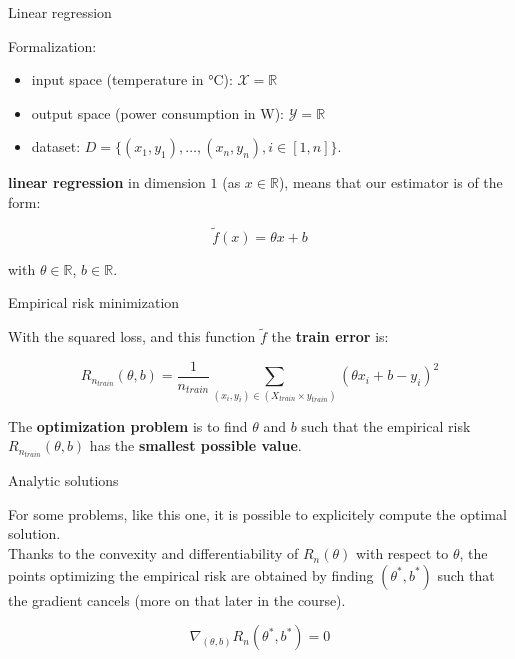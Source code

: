 \documentclass[usenames,dvipsnames,french]{beamer}
\begin{document}
\begin{frame}{Linear regression}

    Formalization:
    \begin{itemize}
        \item input space (temperature in °C): $\mathcal{X} = \mathbb{R}$
        \item output space (power consumption in W): $ \mathcal{Y} = \mathbb{R}$
	\item dataset: $D=\{(x_1, y_1), \dots, (x_n, y_n), i\in[1, n]\}$.
    \end{itemize}

    \textbf{linear regression} in dimension $1$ (as $x\in \mathbb{R}$), means that our estimator is of the form:

    \begin{equation}
        \tilde{f}(x) = \theta x + b
    \end{equation}

    with $\theta\in \mathbb{R}$, $b\in \mathbb{R}$.

\end{frame}

\begin{frame}{Empirical risk minimization}

    With the squared loss, and this function $ \tilde{f}$ the \textbf{train error} is:

    \begin{equation}
	R_{n_{train}}(\theta, b) = \frac{1}{n_{train}} \sum_{(x_i, y_i)\in (X_{train}\times y_{train})} (\theta x_i+b-y_i)^2
    \end{equation}

    The \textbf{optimization problem} is to find $\theta$ and $b$ such that the empirical risk $R_{n_{train}}(\theta, b)$ has the 
    \textbf{smallest possible value}. 
\end{frame}

\begin{frame}{Analytic solutions}

    For some problems, like this one, it is possible to explicitely compute the
    optimal solution.
    \\

    Thanks to the convexity and differentiability of
    $R_n(\theta)$ with respect to $\theta$, the points optimizing the empirical risk are obtained by
    finding $ (\theta^*, b^*)$ such that the gradient cancels (more on that
    later in the course).

    \begin{equation}
        \nabla_{(\theta, b)} R_n(\theta^*, b^*) = 0
    \end{equation}
\end{frame}
\end{document}
